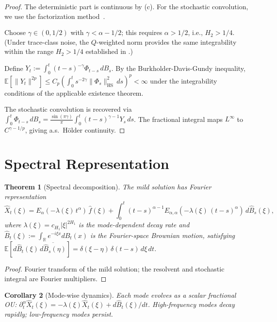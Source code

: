 \documentclass[11pt]{article}
\newtheorem{theorem}{Theorem}[section]
\newtheorem{corollary}[theorem]{Corollary}
\theoremstyle{definition}
\theoremstyle{remark}
\newcommand{\E}{\mathbb{E}}
\newcommand{\R}{\mathbb{R}}
\newcommand{\norm}[1]{\| #1 \|}
\begin{document}
\begin{proof}
The deterministic part is continuous by
(c).  For the stochastic
convolution, we use the factorization
method~\cite{daprato2014}.

Choose $\gamma \in (0, 1/2)$ with
$\gamma < \alpha - 1/2$; this requires
$\alpha > 1/2$, i.e., $H_2 > 1/4$.  (Under trace-class noise, the $Q$-weighted norm
provides the same integrability within the range
$H_2 > 1/4$ established in .)

Define $Y_t := \int_0^t (t-s)^{-\gamma}
\Phi_{t-s}\, dB_s$.  By the Burkholder-Davis-Gundy
inequality,
$\E[\norm{Y_t}^{2p}]
\leq C_p \left(\int_0^t s^{-2\gamma}
\norm{\Phi_s}_{\mathrm{HS}}^2\, ds\right)^p < \infty$
under the integrability conditions of the applicable
existence theorem.

The stochastic convolution is recovered via
$\int_0^t \Phi_{t-s}\, dB_s
= \frac{\sin(\pi\gamma)}{\pi}
\int_0^t (t-s)^{\gamma-1} Y_s\, ds$.
The fractional integral maps $L^\infty$ to
$C^{\gamma - 1/p}$, giving a.s.\ H\"older continuity.
\end{proof}

\section{Spectral Representation}\label{sec:spectral}

\begin{theorem}[Spectral decomposition]\label{thm:spectral}
The mild solution has Fourier representation
\begin{equation}\label{eq:spectral}
\hat{X}_t(\xi) = E_\alpha(-\lambda(\xi)\,t^\alpha)\,\hat{f}(\xi) + \int_0^t (t-s)^{\alpha-1} E_{\alpha,\alpha}(-\lambda(\xi)\,(t-s)^\alpha)\, d\hat{B}_s(\xi),
\end{equation}
where $\lambda(\xi) = c_{H_1}|\xi|^{2H_1}$ is the
mode-dependent decay rate and
$\hat{B}_t(\xi) := \int_\R e^{-i\xi x} dB_t(x)$
is the Fourier-space Brownian motion, satisfying
$\E[d\hat{B}_t(\xi)\,\overline{d\hat{B}_s(\eta)}]
= \delta(\xi - \eta)\,\delta(t-s)\,d\xi\,dt$.
\end{theorem}

\begin{proof}
Fourier transform of the mild solution; the resolvent and stochastic integral are Fourier multipliers.
\end{proof}

\begin{corollary}[Mode-wise dynamics]\label{cor:modewise}
Each mode evolves as a scalar fractional OU: $\partial_t^\alpha \hat{X}_t(\xi) = -\lambda(\xi)\hat{X}_t(\xi) + d\hat{B}_t(\xi)/dt$. High-frequency modes decay rapidly; low-frequency modes persist.
\end{corollary}
\end{document}
